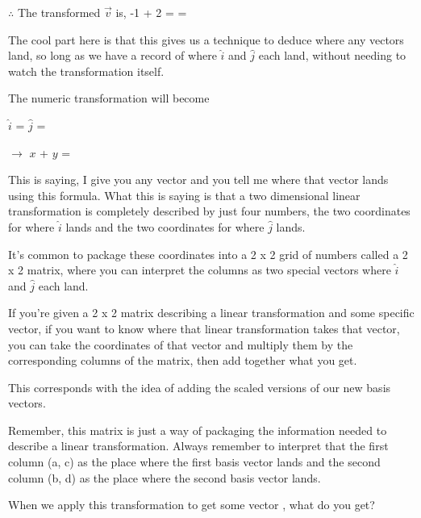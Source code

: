 \documentclass[12pt]{article}
\begin{document}

$\therefore$ The transformed $\vec{v}$ is, -1 + 2 =  = 

The cool part here is that this gives us a technique to deduce where any vectors land, so long as we have a record of where $\hat{i}$ and $\hat{j}$ each land, without needing to watch the transformation itself.

The numeric transformation will become

\begin{center}
    $\hat{i}$ =  $\hat{j}$ = 
\end{center}

\begin{center}
     $\longrightarrow$ $x$ + $y$ = 
\end{center}


This is saying, I give you any vector and you tell me where that vector lands using this formula. What this is saying is that a two dimensional linear transformation is completely described by just four numbers, the two coordinates for where $\hat{i}$ lands and the two coordinates for where $\hat{j}$ lands.

It's common to package these coordinates into a 2 x 2 grid of numbers called a 2 x 2 matrix, where you can interpret the columns as two special vectors where $\hat{i}$ and $\hat{j}$ each land.


If you're given a 2 x 2 matrix describing a linear transformation and some specific vector, if you want to know where that linear transformation takes that vector, you can take the coordinates of that vector and multiply them by the corresponding columns of the matrix, then add together what you get.

This corresponds with the idea of adding the scaled versions of our new basis vectors.


Remember, this matrix is just a way of packaging the information needed to describe a linear transformation. Always remember to interpret that the first column (a, c) as the place where the first basis vector lands and the second column (b, d) as the place where the second basis vector lands.

When we apply this transformation to get some vector , what do you get?

\end{document}
